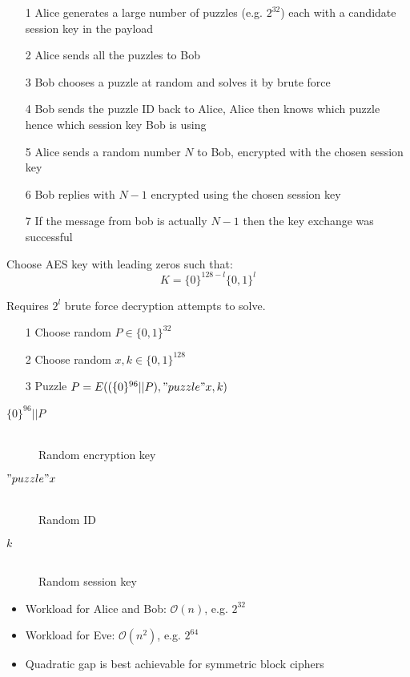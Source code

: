 \documentclass[a4paper]{article}
\begin{document}

\begin{enumerate}
  \item[1] Alice generates a large number of puzzles (e.g. $2^{32}$) each with a
           candidate session key in the payload
  \item[2] Alice sends all the puzzles to Bob
  \item[3] Bob chooses a puzzle at random and solves it by brute force
  \item[4] Bob sends the puzzle ID back to Alice, Alice then knows which puzzle
           hence which session key Bob is using
  \item[5] Alice sends a random number $N$ to Bob, encrypted with the
           chosen session key
  \item[6] Bob replies with $N-1$ encrypted using the chosen session key
  \item[7] If the message from bob is actually $N-1$ then the key exchange was
           successful
\end{enumerate}

Choose AES key with leading zeros such that:
\[K = \{0\}^{128-l} \{0,1\}^{l}\]

Requires $2^{l}$ brute force decryption attempts to solve.


\begin{enumerate}
  \item[1] Choose random $P \in \{0,1\}^{32}$
  \item[2] Choose random $x, k \in \{0,1\}^{128}$
  \item[3] Puzzle $P = E((\{0\}^{96}||P), "puzzle" x, k)$
\end{enumerate}


\begin{description}
  \item[$\{0\}^{96} || P$] \hfill \\
    Random encryption key
  \item[$"puzzle" x$] \hfill \\
    Random ID
  \item[$k$] \hfill \\
    Random session key
\end{description}


\begin{itemize}
  \item Workload for Alice and Bob: $\mathcal{O}(n)$, e.g. $2^{32}$
  \item Workload for Eve: $\mathcal{O}(n^{2})$, e.g. $2^{64}$
  \item Quadratic gap is best achievable for symmetric block ciphers
\end{itemize}
\end{document}

